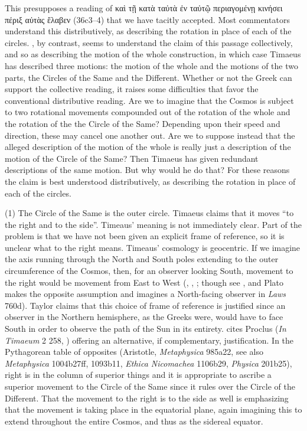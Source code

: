 This presupposes a reading of {\sbl καὶ τῇ κατὰ ταὐτὰ ἐν ταὐτῷ περιαγομένῃ κινήσει πέριξ αὐτὰς ἔλαβεν} (36c3--4) that we have tacitly accepted. Most commentators understand this distributively, as describing the rotation in place of each of the circles. \citet[112 n2]{Archer-Hind:1888qd}, by contrast, seems to understand the claim of this passage collectively, and so as describing the motion of the whole construction, in which case Timaeus has described three motions: the motion of the whole and the motions of the two parts, the Circles of the Same and the Different. Whether or not the Greek can support the collective reading, it raises some difficulties that favor the conventional distributive reading. Are we to imagine that the Cosmos is subject to two rotational movements compounded out of the rotation of the whole and the rotation of the the Circle of the Same? Depending upon their speed and direction, these may cancel one another out. Are we to suppose instead that the alleged description of the motion of the whole is really just a description of the motion of the Circle of the Same? Then Timaeus has given redundant descriptions of the same motion. But why would he do that? For these reasons the claim is best understood distributively, as describing the rotation in place of each of the circles.

(1) The Circle of the Same is the outer circle. Timaeus claims that it moves ``to the right and to the side''. Timeaus' meaning is not immediately clear. Part of the problem is that we have not been given an explicit frame of reference, so it is unclear what to the right means. Timeaus' cosmology is geocentric. If we imagine the axis running through the North and South poles extending to the outer circumference of the Cosmos, then, for an observer looking South, movement to the right would be movement from East to West (\citealt[112--3 n5]{Archer-Hind:1888qd}, \citealt[150]{Taylor:1928qb}, \citealt[34 n23]{Vlastos:1975aa}; though see \citealt[122]{Dicks:1970aa}, and Plato makes the opposite assumption and imagines a North-facing observer in \emph{Laws} 760d). Taylor claims that this choice of frame of reference is justified since an observer in the Northern hemisphere, as the Greeks were, would have to face South in order to observe the path of the Sun in its entirety. \citet[74]{Cornford:1935fk} cites Proclus (\emph{In Timaeum} 2 258, \citealt{Diehl:1903re}) offering an alternative, if complementary, justification. In the Pythagorean table of opposites (Aristotle, \emph{Metaphysica} 985a22, see also \emph{Metaphysica} 1004b27ff, 1093b11, \emph{Ethica Nicomachea} 1106b29, \emph{Physica} 201b25), right is in the column of superior things and it is appropriate to ascribe a superior movement to the Circle of the Same since it rules over the Circle of the Different. That the movement to the right is to the side as well is emphasizing that the movement is taking place in the equatorial plane, again imagining this to extend throughout the entire Cosmos, and thus as the sidereal equator. 

